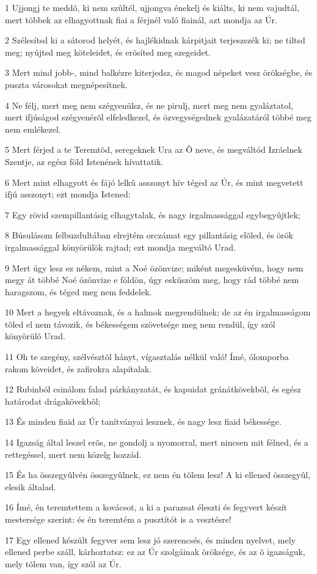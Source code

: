 \par 1 Ujjongj te meddõ, ki nem szûltél, ujjongva énekelj és kiálts, ki nem vajudtál, mert többek az elhagyottnak fiai a férjnél való fiainál, azt mondja az Úr.
\par 2 Szélesítsd ki a sátorod helyét, és hajlékidnak kárpitjait terjeszszék ki; ne tiltsd meg; nyújtsd meg köteleidet, és erõsítsd meg szegeidet.
\par 3 Mert mind jobb-, mind balkézre kiterjedsz, és magod népeket vesz örökségbe, és puszta városokat megnépesítnek.
\par 4 Ne félj, mert meg nem szégyenülsz, és ne pirulj, mert meg nem gyaláztatol, mert ifjúságod szégyenérõl elfeledkezel, és özvegységednek gyalázatáról többé meg nem emlékezel.
\par 5 Mert férjed a te Teremtõd, seregeknek Ura az Õ neve, és megváltód Izráelnek Szentje, az egész föld Istenének hívattatik.
\par 6 Mert mint elhagyott és fájó lelkû asszonyt hív téged az Úr, és mint megvetett ifjú asszonyt; ezt mondja Istened:
\par 7 Egy rövid szempillantásig elhagytalak, és nagy irgalmassággal egybegyûjtlek;
\par 8 Búsulásom felbuzdultában elrejtém orczámat egy pillantásig elõled, és örök irgalmassággal könyörülök rajtad; ezt mondja megváltó Urad.
\par 9 Mert úgy lesz ez nékem, mint a Noé özönvize; miként megesküvém, hogy nem megy át többé Noé özönvize e földön, úgy esküszöm meg, hogy rád többé nem haragszom, és téged meg nem feddelek.
\par 10 Mert a hegyek eltávoznak, és a halmok megrendülnek; de az én irgalmasságom tõled el nem távozik, és békességem szövetsége meg nem rendül, így szól könyörülõ Urad.
\par 11 Oh te szegény, szélvésztõl hányt, vígasztalás nélkül való! Ímé, ólomporba rakom köveidet, és zafirokra alapítalak.
\par 12 Rubinból csinálom falad párkányzatát, és kapuidat gránátkövekbõl, és egész határodat drágakövekbõl;
\par 13 És minden fiaid az Úr tanítványai lesznek, és nagy lesz fiaid békessége.
\par 14 Igazság által leszel erõs, ne gondolj a nyomorral, mert nincsen mit félned, és a rettegéssel, mert nem közelg hozzád.
\par 15 És ha összegyûlvén összegyûlnek, ez nem én tõlem lesz! A ki ellened összegyûl, elesik általad.
\par 16 Ímé, én teremtettem a kovácsot, a ki a parazsat éleszti és fegyvert készít mestersége szerint: és én teremtém a pusztítót is a vesztésre!
\par 17 Egy ellened készült fegyver sem lesz jó szerencsés, és minden nyelvet, mely ellened perbe száll, kárhoztatsz: ez az Úr szolgáinak öröksége, és az õ igazságuk, mely tõlem van, így szól az Úr.

